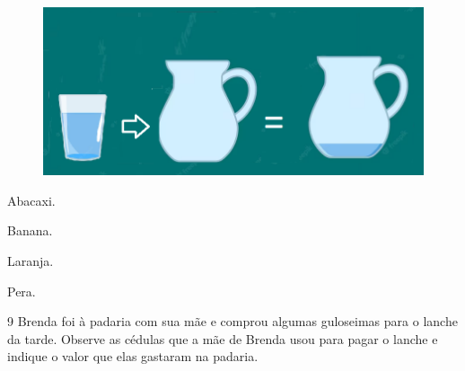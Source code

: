 \begin{figure}[htpb!]
\includegraphics[width=\textwidth]{./media/image144.png}
\end{figure}

\begin{minipage}{.5\textwidth}
\begin{escolha}
\item Abacaxi.

\item Banana.

\item Laranja.

\item Pera.
\end{escolha}
\end{minipage}

\num{9} Brenda foi à padaria com sua mãe e comprou algumas guloseimas para o
lanche da tarde. Observe as cédulas que a mãe de Brenda usou para pagar
o lanche e indique o valor que elas gastaram na padaria.


